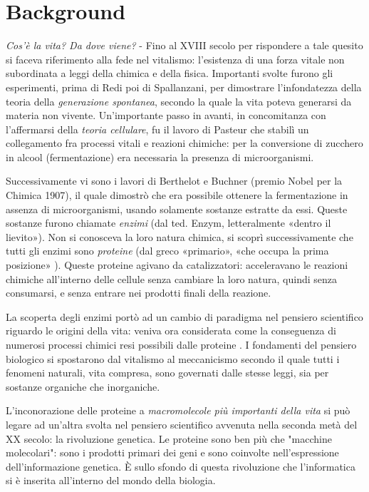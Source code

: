 \chapter{Background}

\textit{Cos'è la vita? Da dove viene?} - Fino al XVIII secolo per rispondere a tale quesito si faceva riferimento alla fede nel vitalismo: l'esistenza di una forza vitale non subordinata a leggi della chimica e  della fisica.
Importanti svolte furono gli esperimenti, prima di Redi poi di Spallanzani, per dimostrare l'infondatezza della teoria della \textit{generazione spontanea}, secondo la quale la vita poteva generarsi da materia non vivente. Un'importante passo in avanti, in concomitanza con l'affermarsi della \textit{teoria cellulare}, fu il lavoro di Pasteur che stabilì un collegamento fra processi vitali e reazioni chimiche: per la conversione di zucchero in alcool (fermentazione) era necessaria la presenza di microorganismi.
\par Successivamente vi sono i lavori di Berthelot e Buchner (premio Nobel per la Chimica 1907), il quale dimostrò che era possibile ottenere la fermentazione in assenza di microorganismi, usando solamente sostanze estratte da essi.
Queste sostanze furono chiamate \textit{enzimi} (dal ted. Enzym, letteralmente «dentro il lievito»\supercite{enzimaTreccani}). Non si conosceva la loro natura chimica, si scoprì successivamente che tutti gli enzimi sono \textit{proteine} (dal greco «primario», «che occupa la prima posizione» \supercite{proteinaTreccani}).
Queste proteine agivano da catalizzatori: acceleravano le reazioni chimiche all'interno delle cellule senza cambiare la loro natura, quindi senza consumarsi, e senza entrare nei prodotti finali della reazione.

\par La scoperta degli enzimi portò ad un cambio di paradigma nel pensiero scientifico riguardo le origini della vita: veniva ora considerata come la conseguenza di numerosi processi chimici resi possibili dalle proteine \supercite{kessel_ben-tal_2018}.
I fondamenti del pensiero biologico si spostarono dal vitalismo al meccanicismo secondo il quale tutti i fenomeni naturali, vita compresa, sono governati dalle stesse leggi, sia per sostanze organiche che inorganiche.

\par L'inconorazione delle proteine a \textit{macromolecole più importanti della vita} si può legare ad un'altra svolta nel pensiero scientifico avvenuta nella seconda metà del XX secolo: la rivoluzione genetica. Le proteine sono ben più che "macchine molecolari": sono i prodotti primari dei geni e sono coinvolte nell'espressione dell'informazione genetica. È sullo sfondo di questa rivoluzione che l'informatica si è inserita all'interno del mondo della biologia.

